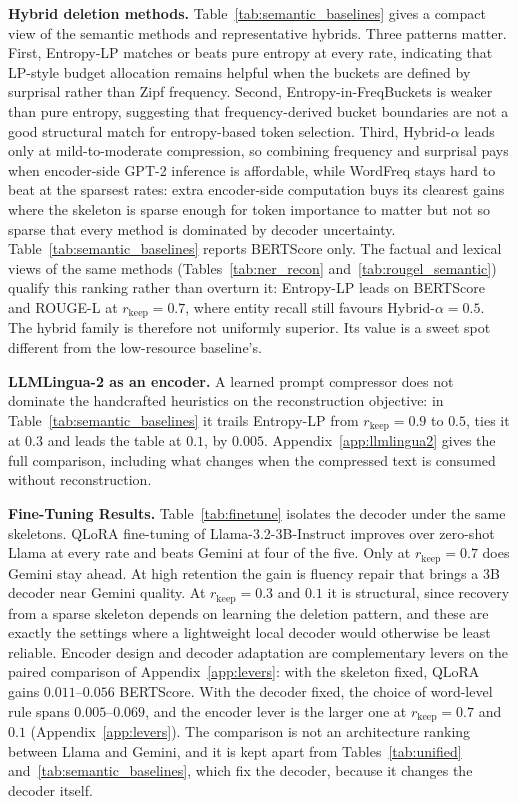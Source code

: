 \documentclass[11pt]{article}
\newcommand{\rkeep}{r_{\mathrm{keep}}}
\begin{document}
\textbf{Hybrid deletion methods.}
\label{sec:hybrid}
Table~\ref{tab:semantic_baselines} gives a compact view of the semantic methods and representative hybrids. Three patterns matter. First, Entropy-LP matches or beats pure entropy at every rate, indicating that LP-style budget allocation remains helpful when the buckets are defined by surprisal rather than Zipf frequency. Second, Entropy-in-FreqBuckets is weaker than pure entropy, suggesting that frequency-derived bucket boundaries are not a good structural match for entropy-based token selection. Third, Hybrid-$\alpha$ leads only at mild-to-moderate compression, so combining frequency and surprisal pays when encoder-side GPT-2 inference is affordable, while WordFreq stays hard to beat at the sparsest rates: extra encoder-side computation buys its clearest gains where the skeleton is sparse enough for token importance to matter but not so sparse that every method is dominated by decoder uncertainty. Table~\ref{tab:semantic_baselines} reports BERTScore only. The factual and lexical views of the same methods (Tables~\ref{tab:ner_recon} and~\ref{tab:rougel_semantic}) qualify this ranking rather than overturn it: Entropy-LP leads on BERTScore and ROUGE-L at $\rkeep = 0.7$, where entity recall still favours Hybrid-$\alpha{=}0.5$. The hybrid family is therefore not uniformly superior. Its value is a sweet spot different from the low-resource baseline's.

\textbf{LLMLingua-2 as an encoder.}
A learned prompt compressor does not dominate the handcrafted heuristics on the reconstruction
objective: in Table~\ref{tab:semantic_baselines} it trails Entropy-LP from
$\rkeep = 0.9$ to $0.5$, ties it at $0.3$ and leads the table at $0.1$, by $0.005$. Appendix~\ref{app:llmlingua2} gives the full comparison, including what changes when
the compressed text is consumed without reconstruction.

\textbf{Fine-Tuning Results.}
\label{sec:finetune_results}
Table~\ref{tab:finetune} isolates the decoder under the same skeletons. QLoRA fine-tuning of Llama-3.2-3B-Instruct improves over zero-shot Llama at every rate and beats Gemini at four of the five. Only at $\rkeep = 0.7$ does Gemini stay ahead. At high retention the gain is fluency repair that brings a 3B decoder near Gemini quality. At $\rkeep = 0.3$ and $0.1$ it is structural, since recovery from a sparse skeleton depends on learning the deletion pattern, and these are exactly the settings where a lightweight local decoder would otherwise be least reliable. Encoder design and decoder adaptation are complementary levers on the paired comparison of Appendix~\ref{app:levers}: with the skeleton fixed, QLoRA gains $0.011$--$0.056$ BERTScore. With the decoder fixed, the choice of word-level rule spans $0.005$--$0.069$, and the encoder lever is the larger one at $\rkeep = 0.7$ and $0.1$ (Appendix~\ref{app:levers}). The comparison is not an architecture ranking between Llama and Gemini, and it is kept apart from Tables~\ref{tab:unified} and~\ref{tab:semantic_baselines}, which fix the decoder, because it changes the decoder itself.
\end{document}
